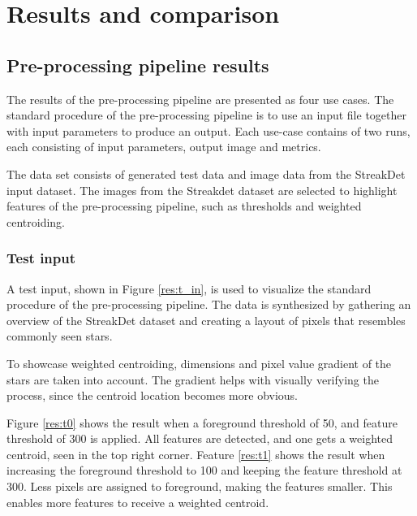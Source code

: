 \documentclass[12pt]{report}
\begin{document}
\chapter{Results and comparison}



\section{Pre-processing pipeline results}
The results of the pre-processing pipeline are presented as four use cases. The standard procedure of the pre-processing pipeline is to use an input file together with input parameters to produce an output. Each use-case contains of two runs, each consisting of input parameters, output image and metrics.  
\par
The data set consists of generated test data and image data from the StreakDet input dataset. The images from the Streakdet dataset are selected to highlight features of the pre-processing pipeline, such as thresholds and weighted centroiding.

\subsection*{Test input}
A test input, shown in Figure \ref{res:t_in}, is used to visualize the standard procedure of the pre-processing pipeline. The data is synthesized by gathering an overview of the StreakDet dataset and creating a layout of pixels that resembles commonly seen stars.
\par
To showcase weighted centroiding, dimensions and pixel value gradient of the stars are taken into account. The gradient helps with visually verifying the process, since the centroid location becomes more obvious.
\par
Figure \ref{res:t0} shows the result when a foreground threshold of 50, and feature threshold of 300 is applied. All features are detected, and one gets a weighted centroid, seen in the top right corner. Feature \ref{res:t1} shows the result when increasing the foreground threshold to 100 and keeping the feature threshold at 300. Less pixels are assigned to foreground, making the features smaller. This enables more features to receive a weighted centroid. 
\end{document}

